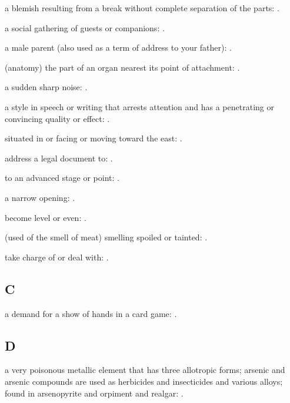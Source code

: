   a blemish resulting from a break without complete separation of the parts: .

  a social gathering of guests or companions: .

  a male parent (also used as a term of address to your father):   .

  (anatomy) the part of an organ nearest its point of attachment: .

  a sudden sharp noise:   .

  a style in speech or writing that arrests attention and has a penetrating or convincing quality or effect: .

  situated in or facing or moving toward the east: .

  address a legal document to: .

  to an advanced stage or point: .

  a narrow opening:   .

  become level or even:   .

  (used of the smell of meat) smelling spoiled or tainted:   .

  take charge of or deal with:   .

\subsection*{C}

  a demand for a show of hands in a card game: .

\subsection*{D}

  a very poisonous metallic element that has three allotropic forms; arsenic and arsenic compounds are used as herbicides and insecticides and various alloys; found in arsenopyrite and orpiment and realgar:   .

